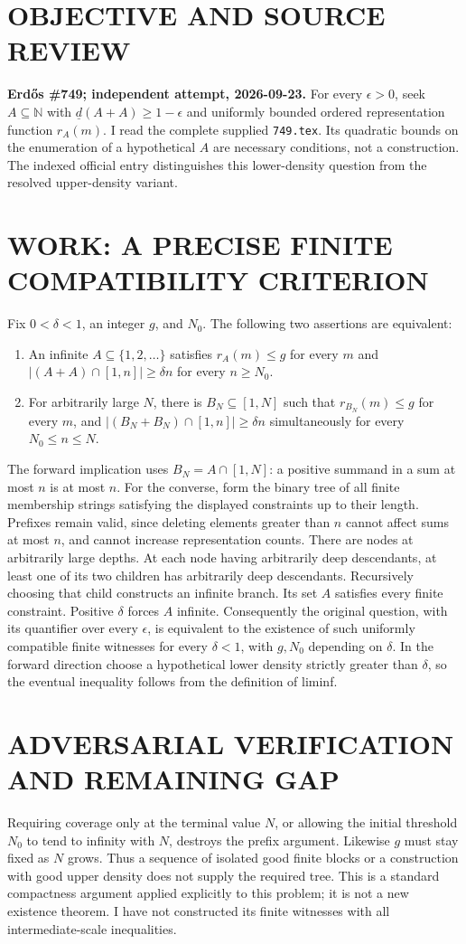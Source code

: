 \section{OBJECTIVE AND SOURCE REVIEW}
\textbf{Erd\H{o}s \#749; independent attempt, 2026-09-23.}
For every $\epsilon>0$, seek $A\subseteq\mathbb N$ with $\underline d(A+A)\ge1-\epsilon$ and uniformly bounded ordered representation function $r_A(m)$. I read the complete supplied \texttt{749.tex}. Its quadratic bounds on the enumeration of a hypothetical $A$ are necessary conditions, not a construction. The indexed official entry distinguishes this lower-density question from the resolved upper-density variant.
\section{WORK: A PRECISE FINITE COMPATIBILITY CRITERION}
Fix $0<\delta<1$, an integer $g$, and $N_0$. The following two assertions are equivalent:
\begin{enumerate}
\item An infinite $A\subseteq\{1,2,\ldots\}$ satisfies $r_A(m)\le g$ for every $m$ and $|(A+A)\cap[1,n]|\ge\delta n$ for every $n\ge N_0$.
\item For arbitrarily large $N$, there is $B_N\subseteq[1,N]$ such that $r_{B_N}(m)\le g$ for every $m$, and $|(B_N+B_N)\cap[1,n]|\ge\delta n$ simultaneously for every $N_0\le n\le N$.
\end{enumerate}
The forward implication uses $B_N=A\cap[1,N]$: a positive summand in a sum at most $n$ is at most $n$.
For the converse, form the binary tree of all finite membership strings satisfying the displayed constraints up to their length. Prefixes remain valid, since deleting elements greater than $n$ cannot affect sums at most $n$, and cannot increase representation counts. There are nodes at arbitrarily large depths. At each node having arbitrarily deep descendants, at least one of its two children has arbitrarily deep descendants. Recursively choosing that child constructs an infinite branch. Its set $A$ satisfies every finite constraint. Positive $\delta$ forces $A$ infinite.
Consequently the original question, with its quantifier over every $\epsilon$, is equivalent to the existence of such uniformly compatible finite witnesses for every $\delta<1$, with $g,N_0$ depending on $\delta$. In the forward direction choose a hypothetical lower density strictly greater than $\delta$, so the eventual inequality follows from the definition of liminf.
\section{ADVERSARIAL VERIFICATION AND REMAINING GAP}
Requiring coverage only at the terminal value $N$, or allowing the initial threshold $N_0$ to tend to infinity with $N$, destroys the prefix argument. Likewise $g$ must stay fixed as $N$ grows. Thus a sequence of isolated good finite blocks or a construction with good upper density does not supply the required tree. This is a standard compactness argument applied explicitly to this problem; it is not a new existence theorem. I have not constructed its finite witnesses with all intermediate-scale inequalities.

